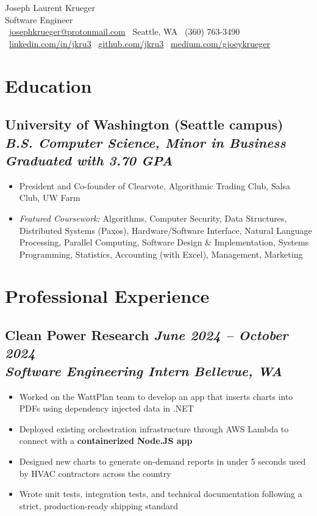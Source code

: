 \documentclass[11pt]{article}
\newcommand{\resumeItem}[1]{
  \item\small{#1}
}
\newcommand{\resumeSubheading}[4]{
  \vspace{-0.5em}
  \subsection{
    \textbf{#1} \hfill \textit{\small#2} \\
    \textit{\small#3} \hfill \textit{\small#4}
  }
  \vspace{-0.5em}
}
\begin{document}
\begin{center}
  {\headingfont\Huge\color{primary} Joseph Laurent Krueger} \\
  \vspace{0.5em}
  {\large Software Engineer} \\
  \vspace{0.5em}
  \faEnvelope\ \href{mailto:josephkrueger@protonmail.com}{josephkrueger@protonmail.com} \hfill
  \faMapMarker\ Seattle, WA \hfill
  \faPhone\ (360) 763-3490 \\
  \faLinkedin\ \href{https://linkedin.com/in/jkru3/}{linkedin.com/in/jkru3} \hfill
  \faGithub\ \href{https://github.com/jkru3}{github.com/jkru3} \hfill
  \faMedium\ \href{https://medium.com/gjoeykrueger}{medium.com/gjoeykrueger}
\end{center}

\section{Education}
\resumeSubheading{University of Washington (Seattle campus)}{}{B.S. Computer Science, Minor in Business}{Graduated with 3.70 GPA}
\begin{itemize}[leftmargin=*]
  \resumeItem{President and Co-founder of Clearvote, Algorithmic Trading Club, Salsa Club, UW Farm}
  \resumeItem{\textit{Featured Coursework:} Algorithms, Computer Security, Data Structures, Distributed Systems (Paxos), Hardware/Software Interface, Natural Language Processing, Parallel Computing, Software Design \& Implementation, Systems Programming, Statistics, Accounting (with Excel), Management, Marketing}
\end{itemize}

\section{Professional Experience}
\resumeSubheading{Clean Power Research}{June 2024 – October 2024}{Software Engineering Intern}{Bellevue, WA}
\begin{itemize}[leftmargin=*]
  \resumeItem{Worked on the WattPlan team to develop an app that inserts charts into PDFs using dependency injected data in .NET}
  \resumeItem{Deployed existing orchestration infrastructure through AWS Lambda to connect with a \textbf{containerized Node.JS app}}
  \resumeItem{Designed new charts to generate on-demand reports in under 5 seconds used by HVAC contractors across the country}
  \resumeItem{Wrote unit tests, integration tests, and technical documentation following a strict, production-ready shipping standard}
\end{itemize}
\end{document}
